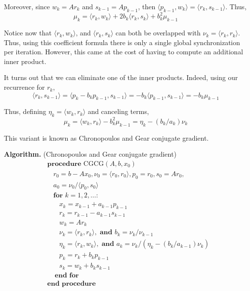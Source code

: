 \documentclass[10pt]{article}
\begin{document}
Moreover, since \(w_k = Ar_k\) and \(s_{k-1} = Ap_{k-1}\), then \(\langle p_{k-1},w_k \rangle = \langle r_{k}, s_{k-1} \rangle\).
Thus,
\[
\mu_k = \langle r_k,w_k\rangle + 2 b_k \langle r_k,s_k \rangle + b_k^2 \mu_{k-1}
\]

Notice now that \(\langle r_k,w_k \rangle\), and \(\langle r_k,s_k \rangle\) can both be overlapped with \(\nu_k = \langle r_k,r_k\rangle\).
Thus, using this coefficient formula there is only a single global synchronization per iteration.
However, this came at the cost of having to compute an additional inner product.

It turns out that we can eliminate one of the inner products.
Indeed, using our recurrence for \(r_k\),
\[
\langle r_k, s_{k-1} \rangle
= \langle p_k - b_k p_{k-1}, s_{k-1} \rangle
= -b_{k} \langle p_{k-1},s_{k-1} \rangle
= -b_k\mu_{k-1}
\]

Thus, defining \(\eta_k = \langle w_k,r_k \rangle\) and canceling terms,
\[
\mu_k = \langle w_k,r_k \rangle - b_k^2 \mu_{k-1}
= \eta_k - (b_k/a_k) \nu_k
\]

This variant is known as Chronopoulos and Gear conjugate gradient.

\textbf{Algorithm.} (Chronopoulos and Gear conjugate gradient)
\begin{align*}
&\textbf{procedure}\text{ CGCG}( A,b,x_0 ) 
\\[-.4em]&~~~~r_0 = b-Ax_0, \nu_0 = \langle r_0,r_0 \rangle, p_0 = r_0, s_0 = Ar_0, 
\\[-.4em]&~~~~a_0 = \nu_0 / \langle p_0,s_0 \rangle
\\[-.4em]&~~~~\textbf{for } k=1,2,\ldots \textbf{:} 
\\[-.4em]&~~~~~~~~x_k = x_{k-1} + a_{k-1} p_{k-1} 
\\[-.4em]&~~~~~~~~r_k = r_{k-1} - a_{k-1} s_{k-1} 
\\[-.4em]&~~~~~~~~w_k = Ar_k 
\\[-.4em]&~~~~~~~~\nu_{k} = \langle r_k,r_k \rangle, \textbf{ and } b_k = \nu_k / \nu_{k-1}
\\[-.4em]&~~~~~~~~\eta_k = \langle r_k, w_k \rangle, \textbf{ and } a_k = \nu_k / (\eta_k - (b_k/a_{k-1})\nu_k)
\\[-.4em]&~~~~~~~~p_k = r_k + b_k p_{k-1}
\\[-.4em]&~~~~~~~~s_k = w_k + b_k s_{k-1}
\\[-.4em]&~~~~~\textbf{end for}
\\[-.4em]&\textbf{end procedure}
\end{align*}
\end{document}
